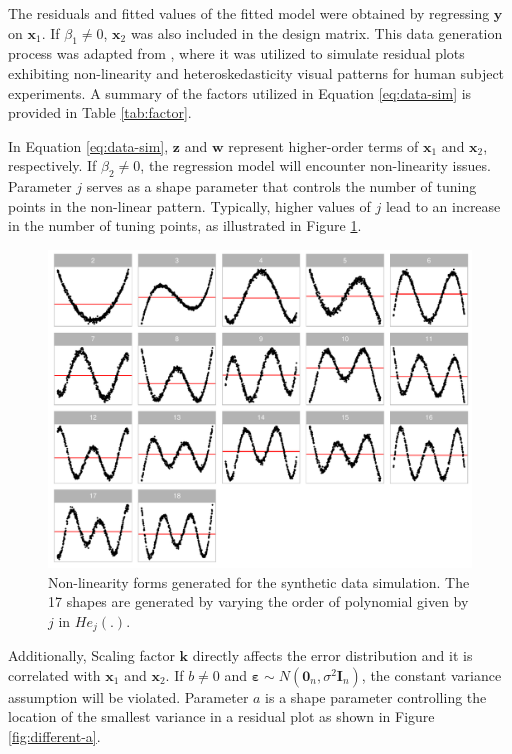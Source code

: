 \documentclass[]{interact}
\theoremstyle{plain}%
\theoremstyle{definition}
\theoremstyle{remark}
\begin{document}
The residuals and fitted values of the fitted model were obtained by
regressing \(\boldsymbol{y}\) on \(\boldsymbol{x}_1\). If
\(\beta_1 \neq 0\), \(\boldsymbol{x}_2\) was also included in the design
matrix. This data generation process was adapted from
\citet{li2023plot}, where it was utilized to simulate residual plots
exhibiting non-linearity and heteroskedasticity visual patterns for
human subject experiments. A summary of the factors utilized in Equation
\ref{eq:data-sim} is provided in Table \ref{tab:factor}.

In Equation \ref{eq:data-sim}, \(\boldsymbol{z}\) and \(\boldsymbol{w}\)
represent higher-order terms of \(\boldsymbol{x}_1\) and
\(\boldsymbol{x}_2\), respectively. If \(\beta_2 \neq 0\), the
regression model will encounter non-linearity issues. Parameter \(j\)
serves as a shape parameter that controls the number of tuning points in
the non-linear pattern. Typically, higher values of \(j\) lead to an
increase in the number of tuning points, as illustrated in Figure
\ref{fig:different-j}.

\begin{figure}[!h]

{\centering \includegraphics[width=1\linewidth]{paper_files/figure-latex/different-j-1} 

}

\caption{Non-linearity forms generated for the synthetic data simulation. The 17 shapes are generated by varying the order of polynomial given by $j$ in $He_j(.)$.}\label{fig:different-j}
\end{figure}

Additionally, Scaling factor \(\boldsymbol{k}\) directly affects the
error distribution and it is correlated with \(\boldsymbol{x}_1\) and
\(\boldsymbol{x}_2\). If \(b \neq 0\) and
\(\boldsymbol{\varepsilon} \sim N(\boldsymbol{0}_n, \sigma^2\boldsymbol{I}_n)\),
the constant variance assumption will be violated. Parameter \(a\) is a
shape parameter controlling the location of the smallest variance in a
residual plot as shown in Figure \ref{fig:different-a}.
\end{document}
